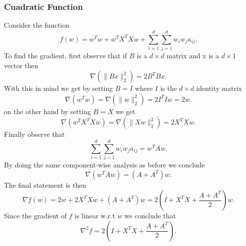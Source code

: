 \documentclass{article}
\begin{document}
\subsubsection{Cuadratic Function}
Consider the function
\begin{equation*}
f(w)=w^{T}w+w^{T}X^{T}Xw+\sum_{i=1}^{d}\sum_{j=1}^{d}w_{i}w_{j}a_{ij}.
\end{equation*}
To find the gradient, first observe that if $B$ is a $d\times d$ matrix and x is a $d\times 1$ vector then
\begin{equation*}
\nabla(\|Bx\|_{2}^{2})=2B^{T}Bx.
\end{equation*}
With this in mind we get by setting $B=I$ where $I$ is the $d\times d$ identity matrix
\begin{equation*}
\nabla(w^{T}w)=\nabla(\|w\|_{2}^{2})=2I^{T}Iw=2w.
\end{equation*}
on the other hand by setting $B=X$ we get
\begin{equation*}
\nabla(w^{T}X^{T}Xw)=\nabla(\|Xw\|_{2}^{2})=2X^{T}Xw.
\end{equation*}
Finally observe that 
\begin{equation*}
\sum_{i=1}^{d}\sum_{j=1}^{d}w_{i}w_{j}a_{ij}=w^{T}Aw.
\end{equation*}
By doing the same component-wise analysis as before we conclude 
\begin{equation*}
\nabla( w^{T}Aw)=(A+A^{T})w.
\end{equation*}
The final statement is then
\begin{equation*}
\nabla f(w)=2w+2X^{T}Xw+(A+A^{T})w=2(I+X^{T}X+\frac{A+A^{T}}{2})w.
\end{equation*}
Since the gradient of $f$ is linear w.r.t $w$ we conclude that
\begin{equation*}
\nabla^{2} f=2(I+X^{T}X+\frac{A+A^{T}}{2}).
\end{equation*}
\end{document}
